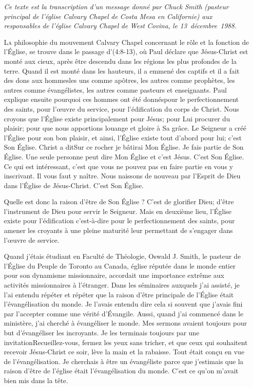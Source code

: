 \mbox{}
\vspace{3cm}

\epigraph{\textit{%
Ce texte est la transcription d'un message donné par Chuck Smith (pasteur principal de l'église Calvary Chapel de
Costa Mesa en Californie) aux responsables de l'église Calvary Chapel de West Covina, le 13~décembre~1988.
}}{}

\lettrine{L}{a} philosophie du mouvement Calvary Chapel concernant le rôle et la fonction de l’Église, se trouve dans le passage
d'(4:8-13), où Paul déclare que Jésus-Christ est monté aux cieux, après être descendu dans les régions les
plus profondes de la terre. Quand il est monté dans les hauteurs, il a emmené des captifs et il a fait des dons aux
hommes\frcolon les uns comme apôtres, les autres comme prophètes, les autres comme évangélistes, les autres comme
pasteurs et enseignants. Paul explique ensuite pourquoi ces hommes ont été donnés\frcolon pour le perfectionnement des
saints, pour l’œuvre du service, pour l’édification du corps de Christ. Nous croyons que l’Église existe principalement
pour Jésus; pour Lui procurer du plaisir; pour que nous apportions louange et gloire à Sa grâce. Le Seigneur a créé
l’Église pour son bon plaisir, et ainsi, l’Église existe tout d’abord pour lui; c’est Son Église. Christ a dit\frcolon\og Sur ce rocher
je bâtirai Mon Église\fg{}. Je fais partie de Son Église. Une seule personne peut dire \og Mon Église\fg{} et c’est Jésus. C’est
Son Église. Ce qui est intéressant, c’est que vous ne pouvez pas en faire partie en vous y inscrivant. Il vous faut y
naître. Nous naissons de nouveau par l’Esprit de Dieu dans l’Église de Jésus-Christ. C’est Son Église.

Quelle est donc la raison d'être de Son Église ? C'est de glorifier Dieu; d’être l’instrument de Dieu pour servir le
Seigneur. Mais en deuxième lieu, l’Église existe pour l’édification c'est-à-dire pour le perfectionnement des saints, pour
amener les croyants à une pleine maturité leur permettant de s’engager dans l’œuvre de service.

Quand j’étais étudiant en Faculté de Théologie, Oswald J. Smith, le pasteur de l’Église du Peuple de Toronto au
Canada, église réputée dans le monde entier pour son dynamisme missionnaire, accordait une importance extrême
aux activités missionnaires à l’étranger. Dans les séminaires auxquels j’ai assisté, je l’ai entendu répéter et répéter
que la raison d'être principale de l’Église était l’évangélisation du monde. Je l’avais entendu dire cela si souvent que
j’avais fini par l’accepter comme une vérité d’Évangile. Aussi, quand j’ai commencé dans le ministère, j’ai cherché à
évangéliser le monde. Mes sermons avaient toujours pour but d'évangéliser les incroyants. Je les terminais toujours
par une invitation\frcolon\og Recueillez-vous, fermez les yeux sans tricher, et que ceux qui souhaitent recevoir Jésus-Christ ce
soir, lève la main et la rabaisse\fg{}. Tout était conçu en vue de l’évangélisation. Je cherchais à être un évangéliste parce
que j’estimais que la raison d'être de l’église était l’évangélisation du monde. C'est ce qu'on m'avait bien mis dans la
tête.

